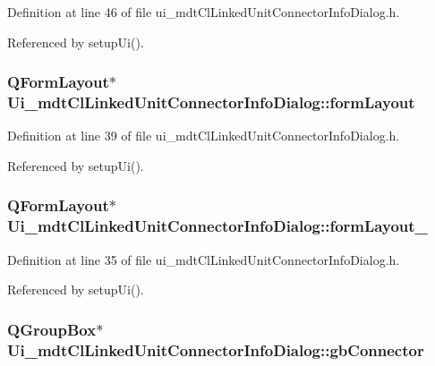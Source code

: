 Definition at line 46 of file ui\-\_\-mdt\-Cl\-Linked\-Unit\-Connector\-Info\-Dialog.\-h.



Referenced by setup\-Ui().

\hypertarget{class_ui__mdt_cl_linked_unit_connector_info_dialog_a1d131b2dd7ee7aced11b174aee1735be}{
\subsubsection[{form\-Layout}]{\setlength{\rightskip}{0pt plus 5cm}Q\-Form\-Layout$\ast$ Ui\-\_\-mdt\-Cl\-Linked\-Unit\-Connector\-Info\-Dialog\-::form\-Layout}}\label{class_ui__mdt_cl_linked_unit_connector_info_dialog_a1d131b2dd7ee7aced11b174aee1735be}


Definition at line 39 of file ui\-\_\-mdt\-Cl\-Linked\-Unit\-Connector\-Info\-Dialog.\-h.



Referenced by setup\-Ui().

\hypertarget{class_ui__mdt_cl_linked_unit_connector_info_dialog_a5d257c90710ebdc8ede8cab3748108ef}{
\subsubsection[{form\-Layout\-\_\-2}]{\setlength{\rightskip}{0pt plus 5cm}Q\-Form\-Layout$\ast$ Ui\-\_\-mdt\-Cl\-Linked\-Unit\-Connector\-Info\-Dialog\-::form\-Layout\-\_}}\label{class_ui__mdt_cl_linked_unit_connector_info_dialog_a5d257c90710ebdc8ede8cab3748108ef}


Definition at line 35 of file ui\-\_\-mdt\-Cl\-Linked\-Unit\-Connector\-Info\-Dialog.\-h.



Referenced by setup\-Ui().

\hypertarget{class_ui__mdt_cl_linked_unit_connector_info_dialog_a58abb95c7f61995cefd76386eeb4b43d}{
\subsubsection[{gb\-Connector}]{\setlength{\rightskip}{0pt plus 5cm}Q\-Group\-Box$\ast$ Ui\-\_\-mdt\-Cl\-Linked\-Unit\-Connector\-Info\-Dialog\-::gb\-Connector}}\label{class_ui__mdt_cl_linked_unit_connector_info_dialog_a58abb95c7f61995cefd76386eeb4b43d}


